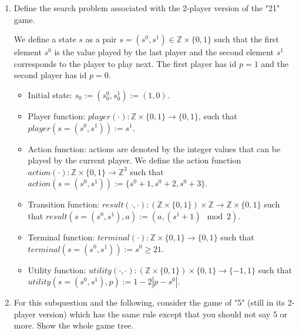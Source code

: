 \documentclass[9pt,a4paper]{extarticle}
\newenvironment{solution}
    {%
    \color{red}
    }
    { 
    \color{black}
    }
\begin{document}
\begin{enumerate}
    \item Define the search problem associated with the 2-player version of the "21" game.

    \begin{solution}
        We define a state $s$ as a pair $s = (s^0, s^1) \in \mathbb{Z}\times \{0, 1\}$ such that the first element $s^0$ is the value played by the last player and the second element $s^1$ corresponds to the player to play next. The first player has id $p=1$ and the second player has id $p=0$.
        \begin{itemize}
            \item Initial state: $s_0 := (s_0^0, s_0^1) := (1, 0)$.
            \item Player function: $player(\cdot): \mathbb{Z}\times \{0, 1\} \rightarrow \{0, 1\}$, such that
            $player(s= (s^0, s^1)) := s^1$.
            \item Action function: actions are denoted by the integer values that can be played by the current player. We define the action function $action(\cdot): \mathbb{Z}\times \{0, 1\}\rightarrow \mathbb{Z}^3$ such that $action(s= (s^0, s^1)) := \{s^0 + 1, s^0 + 2, s^0 + 3\} $.
            \item Transition function: $result(\cdot, \cdot): (\mathbb{Z}\times \{0, 1\})\times \mathbb{Z} \rightarrow \mathbb{Z}\times \{0, 1\}$ such that $result(s=(s^0, s^1), a) := (a, (s^1 + 1)\mod 2)$.
            \item Terminal function: $terminal(\cdot): \mathbb{Z}\times \{0, 1\} \rightarrow \{0, 1\}$ such that $terminal(s=(s^0, s^1)) := s^0 \geq 21$.
            \item Utility function: $utility(\cdot, \cdot): (\mathbb{Z}\times \{0, 1\}) \times \{0, 1\} \rightarrow \{-1, 1\}$ such that $utility(s=(s^0, s^1), p) := 1 - 2|p - s^0|$.
        \end{itemize}
    \end{solution}
    
    \item For this subquestion and the following, consider the game of "5" (still in its 2-player version) which has the same rule except that you should not say 5 or more. Show the whole game tree.
    

\end{enumerate}
\end{document}
